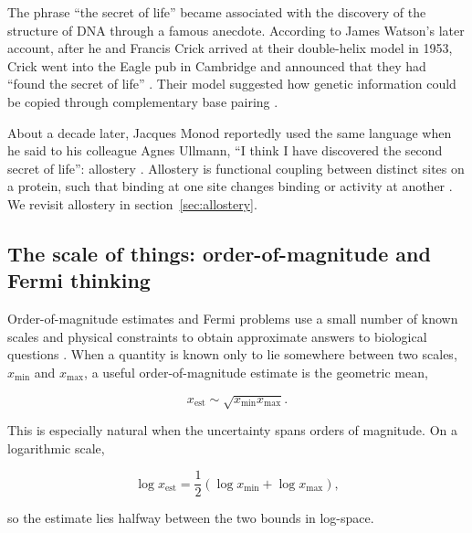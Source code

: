 

The phrase ``the secret of life'' became associated with the discovery of the structure of DNA through a famous anecdote.
According to James Watson's later account, after he and Francis Crick arrived at their double-helix model in 1953, Crick went into the Eagle pub in Cambridge and announced that they had ``found the secret of life'' \cite{watson2003dna}.
Their model suggested how genetic information could be copied through complementary base pairing \cite{watson1953molecular,watson1993genetical}.

About a decade later, Jacques Monod reportedly used the same language when he said to his colleague Agnes Ullmann, ``I think I have discovered the second secret of life'': allostery \cite{ullmann2011memoriam}.
Allostery is functional coupling between distinct sites on a protein, such that binding at one site changes binding or activity at another \cite{fenton2008allostery}.
We revisit allostery in section~\ref{sec:allostery}.
\subsection{The scale of things: order-of-magnitude and Fermi thinking}
\label{sec:scale}



Order-of-magnitude estimates and Fermi problems use a small number of known scales and physical constraints to obtain approximate answers to biological questions \cite{phillips2009feeling}.
When a quantity is known only to lie somewhere between two scales,
$x_{\min}$ and $x_{\max}$, a useful order-of-magnitude estimate is the geometric mean,

\[
    x_{\mathrm{est}} \sim \sqrt{x_{\min}x_{\max}}.
\]

This is especially natural when the uncertainty spans orders of magnitude.
On a logarithmic scale,

\[
    \log x_{\mathrm{est}} = \frac{1}{2} \left( \log x_{\min} + \log x_{\max} \right),
\]

so the estimate lies halfway between the two bounds in log-space.

